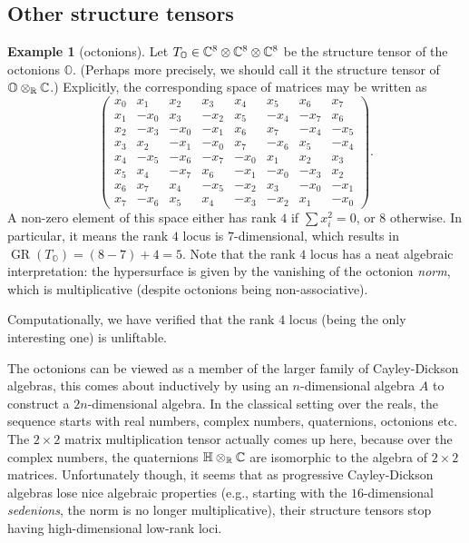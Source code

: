 \documentclass[a4paper,10pt]{article}
\def\oct{\mathbb O}
\def\mtrx#1{\begin{pmatrix}#1\end{pmatrix}}
\DeclareMathOperator{\GR}{GR}
\theoremstyle{definition}
\newtheorem{example}[theorem]{Example}
\theoremstyle{remark}
\begin{document}
\subsection{Other structure tensors}

\begin{example}[octonions]
Let $T_{\oct}\in \ce^8\otimes\ce^8\otimes\ce^8$ be the structure tensor of the octonions $\oct$. (Perhaps more precisely, we should call it the structure tensor of $\oct\otimes_{\er}\ce$.) Explicitly, the corresponding space of matrices may be written as
\[
    \mtrx{
        x_0 &  x_1 &  x_2 &  x_3 &  x_4 &  x_5 &  x_6 &  x_7\\
        x_1 & -x_0 &  x_3 & -x_2 &  x_5 & -x_4 & -x_7 &  x_6\\
        x_2 & -x_3 & -x_0 & -x_1 &  x_6 &  x_7 & -x_4 & -x_5\\
        x_3 &  x_2 & -x_1 & -x_0 &  x_7 & -x_6 &  x_5 & -x_4\\
        x_4 & -x_5 & -x_6 & -x_7 & -x_0 &  x_1 &  x_2 &  x_3\\
        x_5 &  x_4 & -x_7 &  x_6 & -x_1 & -x_0 & -x_3 &  x_2\\
        x_6 &  x_7 &  x_4 & -x_5 & -x_2 &  x_3 & -x_0 & -x_1\\
        x_7 & -x_6 &  x_5 &  x_4 & -x_3 & -x_2 &  x_1 & -x_0
    }.
\]
A non-zero element of this space either has rank $4$ if $\sum x_i^2 = 0$, or $8$ otherwise. In particular, it means the rank $4$ locus is $7$-dimensional, which results in $\GR(T_{\oct}) = (8-7)+4 = 5$. Note that the rank $4$ locus has a neat algebraic interpretation: the hypersurface is given by the vanishing of the octonion \emph{norm}, which is multiplicative (despite octonions being non-associative).

Computationally, we have verified that the rank $4$ locus (being the only interesting one) is unliftable.
\end{example}

The octonions can be viewed as a member of the larger family of Cayley-Dickson algebras, this comes about inductively by using an $n$-dimensional algebra $A$ to construct a $2n$-dimensional algebra. In the classical setting over the reals, the sequence starts with real numbers, complex numbers, quaternions, octonions etc. The $2\times2$ matrix multiplication tensor actually comes up here, because over the complex numbers, the quaternions $\mathbb H\otimes_{\er}\ce$ are isomorphic to the algebra of $2\times 2$ matrices. Unfortunately though, it seems that as progressive Cayley-Dickson algebras lose nice algebraic properties (e.g., starting with the $16$-dimensional \emph{sedenions}, the norm is no longer multiplicative), their structure tensors stop having high-dimensional low-rank loci.
\end{document}
